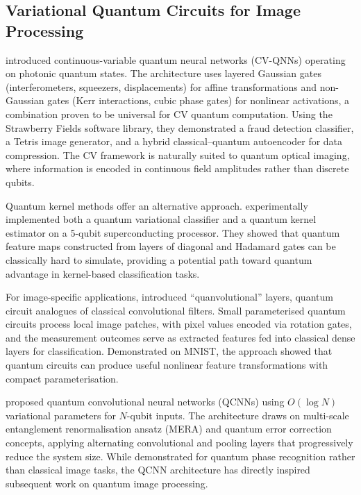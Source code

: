 \subsection{Variational Quantum Circuits for Image Processing}

\citet{killoran2019} introduced continuous-variable quantum neural networks (CV-QNNs) operating on photonic quantum states. The architecture uses layered Gaussian gates (interferometers, squeezers, displacements) for affine transformations and non-Gaussian gates (Kerr interactions, cubic phase gates) for nonlinear activations, a combination proven to be universal for CV quantum computation. Using the Strawberry Fields software library, they demonstrated a fraud detection classifier, a Tetris image generator, and a hybrid classical--quantum autoencoder for data compression. The CV framework is naturally suited to quantum optical imaging, where information is encoded in continuous field amplitudes rather than discrete qubits.

Quantum kernel methods offer an alternative approach. \citet{havlicek2019} experimentally implemented both a quantum variational classifier and a quantum kernel estimator on a 5-qubit superconducting processor. They showed that quantum feature maps constructed from layers of diagonal and Hadamard gates can be classically hard to simulate, providing a potential path toward quantum advantage in kernel-based classification tasks.

For image-specific applications, \citet{henderson2020} introduced ``quanvolutional'' layers, quantum circuit analogues of classical convolutional filters. Small parameterised quantum circuits process local image patches, with pixel values encoded via rotation gates, and the measurement outcomes serve as extracted features fed into classical dense layers for classification. Demonstrated on MNIST, the approach showed that quantum circuits can produce useful nonlinear feature transformations with compact parameterisation.

\citet{cong2019} proposed quantum convolutional neural networks (QCNNs) using $O(\log N)$ variational parameters for $N$-qubit inputs. The architecture draws on multi-scale entanglement renormalisation ansatz (MERA) and quantum error correction concepts, applying alternating convolutional and pooling layers that progressively reduce the system size. While demonstrated for quantum phase recognition rather than classical image tasks, the QCNN architecture has directly inspired subsequent work on quantum image processing.

